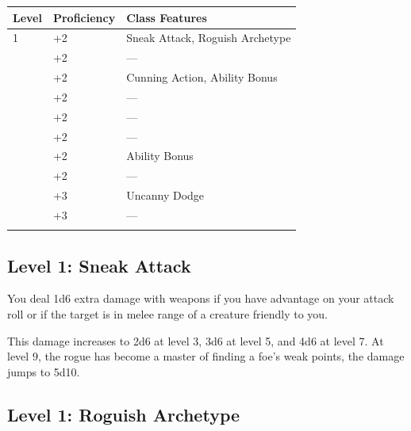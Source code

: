 \documentclass[12pt,letterpaper,twocolumn,openany,nodeprecatedcode,bg=none]{dndbook}
\let\oldsubsection\subsection
\renewcommand{\subsection}[1]{%
  \needspace{5\baselineskip}%
  \oldsubsection{#1}%
}
\begin{document}

{\def\LTcaptype{none} %
\begin{table}[!htbp]
\centering
\begin{tabular}{@{}
  >{\raggedright\arraybackslash}p{}
  >{\raggedright\arraybackslash}p{}
  >{\raggedright\arraybackslash}p{}@{}}
\toprule\noalign{}
\begin{minipage}[b]{\linewidth}\raggedright
Level
\end{minipage} & \begin{minipage}[b]{\linewidth}\raggedright
Proficiency
\end{minipage} & \begin{minipage}[b]{\linewidth}\raggedright
Class Features
\end{minipage} \\
\midrule\noalign{}
1 & +2 & Sneak Attack, Roguish Archetype \\
2 & +2 & --- \\
3 & +2 & Cunning Action, Ability Bonus \\
4 & +2 & --- \\
5 & +2 & --- \\
6 & +2 & --- \\
7 & +2 & Ability Bonus \\
8 & +2 & --- \\
9 & +3 & Uncanny Dodge \\
10 & +3 & --- \\
\bottomrule\noalign{}
\end{tabular}
\end{table}
}

\subsection{Level 1: Sneak Attack}\label{level-1-sneak-attack}

You deal 1d6 extra damage with weapons if you have advantage on your
attack roll or if the target is in melee range of a creature friendly to
you.

This damage increases to 2d6 at level 3, 3d6 at level 5, and 4d6 at
level 7. At level 9, the rogue has become a master of finding a foe's
weak points, the damage jumps to 5d10.

\twocolumn

\subsection{Level 1: Roguish Archetype}\label{level-1-roguish-archetype}
\end{document}
